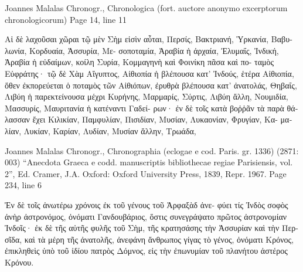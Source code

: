 \documentclass[12pt,letterpaper,twoside,final]{memoir}
\begin{document}
\begin{greek}
Joannes Malalas Chronogr., Chronologica (fort. auctore anonymo excerptorum chronologicorum) 
Page 14, line 11

Αἱ δὲ λαχοῦσαι χῶραι τῷ μὲν Σὴμ εἰσὶν αὗται, Περσίς, 
Βακτριανή, Ὑρκανία, Βαβυλωνία, Κορδυαία, Ἀσσυρία, Με-
σοποταμία, Ἀραβία ἡ ἀρχαία, Ἐλυμαΐς, Ἰνδική, Ἀραβία ἡ 
εὐδαίμων, κοίλη Συρία, Κομμαγηνὴ καὶ Φοινίκη πᾶσα καὶ πο-
ταμὸς Εὐφράτης· τῷ δὲ Χὰμ Αἴγυπτος, Αἰθιοπία ἡ βλέπουσα 
κατ' Ἰνδούς, ἑτέρα Αἰθιοπία, ὅθεν ἐκπορεύεται ὁ ποταμὸς τῶν 
Αἰθιόπων, ἐρυθρὰ βλέπουσα κατ' ἀνατολάς, Θηβαΐς, Λιβύη 
ἡ παρεκτείνουσα μέχρι Κυρήνης, Μαρμαρίς, Σύρτις, Λιβύη 
ἄλλη, Νουμιδία, Μασσυρίς, Μαυριτανία ἡ κατέναντι Γαδεί-
ρων· ἐν δὲ τοῖς κατὰ βοῤῥᾶν τὰ παρὰ θάλασσαν ἔχει Κιλικίαν,   
Παμφυλίαν, Πισιδίαν, Μυσίαν, Λυκαονίαν, Φρυγίαν, Κα-
μαλίαν, Λυκίαν, Καρίαν, Λυδίαν, Μυσίαν ἄλλην, Τρωάδα, 




Joannes Malalas Chronogr., Chronographia (eclogae e cod. Paris. gr. 1336) (2871: 003)
“Anecdota Graeca e codd. manuscriptis bibliothecae regiae Parisiensis, vol. 2”, Ed. Cramer, J.A.
Oxford: Oxford University Press, 1839, Repr. 1967.
Page 234, line 6

Ἐν δὲ τοῖς ἀνωτέρω χρόνοις ἐκ τοῦ γένους τοῦ Ἀρφαξὰδ ἀνε-
φύει τίς Ἰνδὸς σοφὸς ἀνὴρ ἀστρονόμος, ὀνόματι Γανδουβάριος, 
ὅστις συνεγράψατο πρῶτος ἀστρονομίαν Ἰνδοῖς· ἐκ δὲ τῆς αὐτῆς 
φυλῆς τοῦ Σὴμ, τῆς κρατησάσης τὴν Ἀσσυρίαν καὶ τὴν Περ-
σῖδα, καὶ τὰ μέρη τῆς ἀνατολῆς, ἀνεφάνη ἄνθρωπος γίγας τὸ 
γένος, ὀνόματι Κρόνος, ἐπικληθεὶς ὑπὸ τοῦ ἰδίου πατρὸς Δόμνος, 
εἰς τὴν ἐπωνυμίαν τοῦ πλανήτου ἀστέρος Κρόνου. 

\end{greek}
\end{document}
